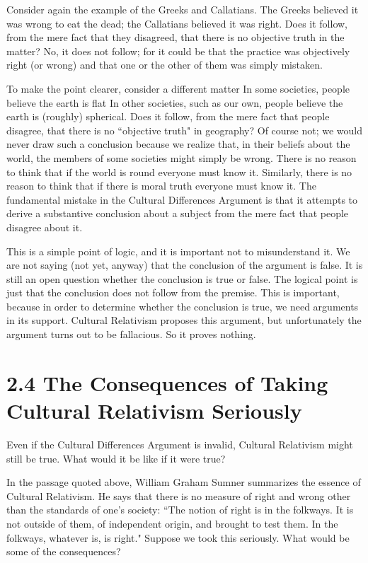 Consider  again  the  example  of  the  Greeks  and  Callatians.  The  Greeks 
believed  it  was  wrong  to  eat  the  dead;  the  Callatians  believed  it  was 
right. Does it follow, from the mere fact that they disagreed, that there is 
no objective truth in the matter? No, it does not follow; for it could be that 
the practice was objectively right (or wrong) and that one or the other of 
them was simply mistaken. 

To make the point clearer, consider a different matter In some societies, 
people  believe  the  earth  is  flat  In  other  societies,  such  as  our  own,
people believe  the  earth  is  (roughly)  spherical.  Does  it  follow,  from  the 
mere  fact  that  people  disagree,  that  there  is  no  ``objective  truth"  in 
geography?  Of  course  not;  we  would  never  draw  such  a  conclusion 
because we realize that, in their beliefs about the world, the members of 
some societies might simply be wrong. There is no reason to think that if 
the world is round everyone must know it. Similarly, there is no reason to 
think that if there is moral truth everyone must know it. The fundamental 
mistake in the Cultural Differences Argument is that it attempts to derive 
a substantive conclusion about a subject from the mere fact that people 
disagree about it. 

This is a simple point of logic, and it is important not to misunderstand it. 
We are not saying (not yet, anyway) that the conclusion of the argument 
is false. It is still an open question whether the conclusion is true or false. 
The  logical  point  is  just  that  the  conclusion  does  not  follow  from  the 
premise.  This  is  important,  because  in  order  to  determine  whether  the 
conclusion is true, we need arguments in its support. Cultural Relativism 
proposes  this  argument,  but  unfortunately  the  argument  turns  out to  be 
fallacious. So it proves nothing.  

\section{2.4 The Consequences of Taking Cultural Relativism Seriously} 
Even  if  the  Cultural  Differences  Argument  is  invalid,  Cultural  Relativism 
might still be true. What would it be like if it were true? 

In the passage quoted above, William Graham Sumner summarizes the 
essence of Cultural Relativism. He says that there is no measure of right 
and wrong other than the standards of one's society: ``The notion of right 
is  in  the  folkways.  It  is  not  outside  of  them,  of  independent  origin,  and 
brought to test them. In the folkways, whatever is, is right." Suppose we 
took this seriously. What would be some of the consequences? 
